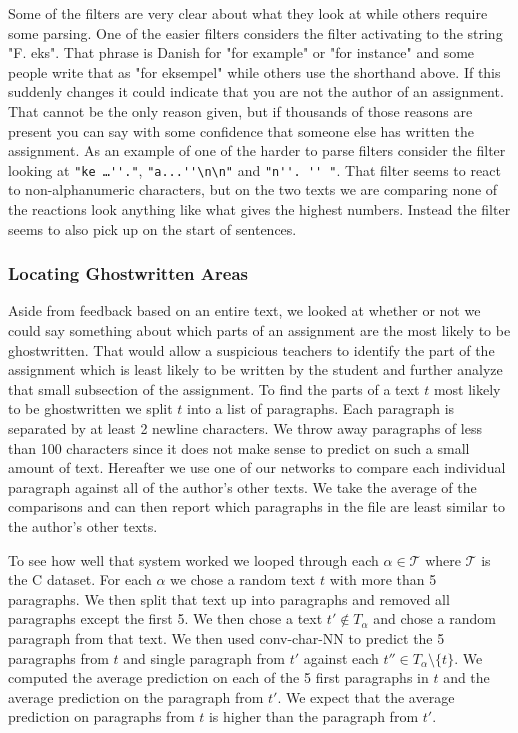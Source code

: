 Some of the filters are very clear about what they look at while others require
some parsing. One of the easier filters considers the filter activating to the
string "F. eks". That phrase is Danish for "for example" or "for instance" and
some people write that as "for eksempel" while others use the shorthand above.
If this suddenly changes it could indicate that you are not the author of an
assignment. That cannot be the only reason given, but if thousands of those
reasons are present you can say with some confidence that someone else has
written the assignment. As an example of one of the harder to parse filters
consider the filter looking at \verb["ke …''."[, \verb["a...''\n\n"[ and
\verb["n''. '' "[. That filter seems to react to non-alphanumeric characters,
but on the two texts we are comparing none of the reactions look anything like
what gives the highest numbers. Instead the filter seems to also pick up on the
start of sentences.


\subsubsection{Locating Ghostwritten Areas}
\label{subsubsec:ghost_written_areas}

Aside from feedback based on an entire text, we looked at whether or not we
could say something about which parts of an assignment are the most likely to be
ghostwritten. That would allow a suspicious teachers to identify the part of
the assignment which is least likely to be written by the student and further
analyze that small subsection of the assignment. To find the parts of a text
$t$ most likely to be ghostwritten we split $t$ into a list of paragraphs.
Each paragraph is separated by at least 2 newline characters. We throw away
paragraphs of less than 100 characters since it does not make sense to predict
on such a small amount of text. Hereafter we use one of our networks to compare
each individual paragraph against all of the author's other texts. We take the
average of the comparisons and can then report which paragraphs in the file are
least similar to the author's other texts.

To see how well that system worked we looped through each $\alpha \in
\mathcal{T}$ where $\mathcal{T}$ is the \gls{C} dataset. For each $\alpha$ we
chose a random text $t$ with more than 5 paragraphs. We then split that text up
into paragraphs and removed all paragraphs except the first 5. We then chose
a text $t' \not\in T_\alpha$ and chose a random paragraph from that text. We
then used \gls{conv-char-NN} to predict the 5 paragraphs from $t$ and single
paragraph from $t'$ against each $t'' \in T_\alpha \setminus \{t\}$. We computed
the average prediction on each of the 5 first paragraphs in $t$ and the average
prediction on the paragraph from $t'$. We expect that the average prediction on
paragraphs from $t$ is higher than the paragraph from $t'$.

